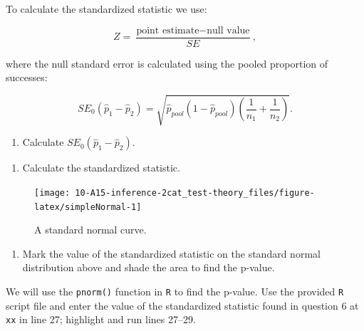 \documentclass[
]{report}
\providecommand{\tightlist}{%
  \setlength{\itemsep}{0pt}\setlength{\parskip}{0pt}}
\begin{document}
\vspace{0.8in}

\newpage

To calculate the standardized statistic we use:

\[
Z = \frac{\text{point estimate} - \text{null value}}{SE},
\]

where the null standard error is calculated using the pooled proportion of successes:

\[
SE_0(\hat{p}_1-\hat{p}_2)=\sqrt{\hat{p}_{pool}(1-\hat{p}_{pool})\left(\frac{1}{n_1}+\frac{1}{n_2}\right)}.
\]

\begin{enumerate}
\def\labelenumi{\arabic{enumi}.}
\setcounter{enumi}{4}
\tightlist
\item
  Calculate \(SE_0(\hat{p}_1-\hat{p}_2)\).
\end{enumerate}

\vspace{1in}

\begin{enumerate}
\def\labelenumi{\arabic{enumi}.}
\setcounter{enumi}{5}
\tightlist
\item
  Calculate the standardized statistic.
\end{enumerate}

\vspace{1in}

\begin{figure}

{\centering \texttt{[image: 10-A15-inference-2cat\_test-theory\_files/figure-latex/simpleNormal-1]} 

}

\caption{A standard normal curve.}\label{fig:simpleNormal}
\end{figure}

\begin{enumerate}
\def\labelenumi{\arabic{enumi}.}
\setcounter{enumi}{6}
\tightlist
\item
  Mark the value of the standardized statistic on the standard normal distribution above and shade the area to find the p-value.
\end{enumerate}

\vspace{0.1in}

We will use the \texttt{pnorm()} function in \texttt{R} to find the p-value. Use the provided \texttt{R} script file and enter the value of the standardized statistic found in question 6 at \texttt{xx} in line 27; highlight and run lines 27--29.
\end{document}
